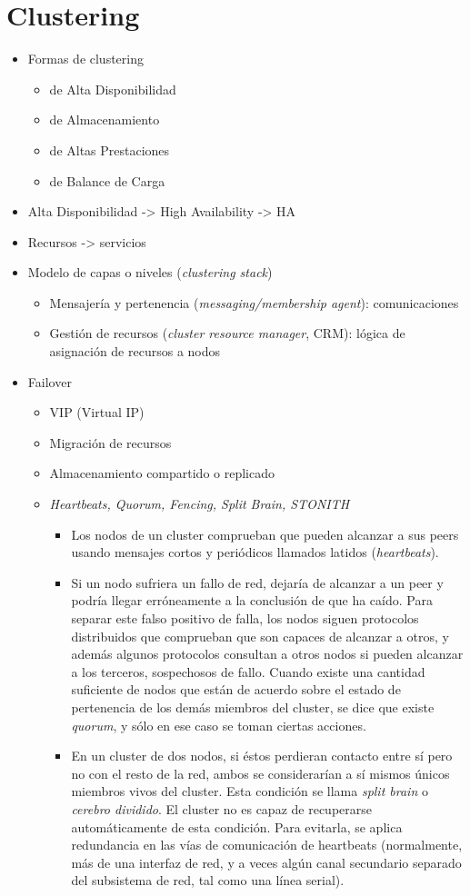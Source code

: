 
\section {Clustering}
\begin{itemize}
	\item Formas de clustering
	\begin{itemize}
		\item de Alta Disponibilidad
		\item de Almacenamiento
		\item de Altas Prestaciones
		\item de Balance de Carga
	\end{itemize}
	\item Alta Disponibilidad -> High Availability -> HA 
	\item Recursos ->  servicios
	\item Modelo de capas o niveles (\textit{clustering stack})
	\begin{itemize}
		\item Mensajería y pertenencia (\textit{messaging/membership agent}): comunicaciones
		\item Gestión de recursos (\textit{cluster resource manager}, CRM): lógica de asignación de recursos a nodos 
	\end{itemize}
	\item Failover
	\begin{itemize}
		\item VIP (Virtual IP)
		\item Migración de recursos
		\item Almacenamiento compartido o replicado
		\item \textit{Heartbeats, Quorum, Fencing, Split Brain, STONITH}
		\begin{itemize}
			\item Los nodos de un cluster comprueban que pueden alcanzar a sus peers usando mensajes cortos y periódicos llamados latidos (\textit{heartbeats}).
			\item Si un nodo sufriera un fallo de red, dejaría de alcanzar a un peer y podría llegar erróneamente a la conclusión de que ha caído. Para separar este falso positivo de falla, los nodos siguen protocolos distribuidos que comprueban que son capaces de alcanzar a otros, y además algunos protocolos consultan a otros nodos si pueden alcanzar a los terceros, sospechosos de fallo. Cuando existe una cantidad suficiente de nodos que están de acuerdo sobre el estado de pertenencia de los demás miembros del cluster, se dice que existe \textit{quorum}, y sólo en ese caso se toman ciertas acciones.
			\item En un cluster de dos nodos, si éstos perdieran contacto entre sí pero no con el resto de la red, ambos se considerarían a sí mismos únicos miembros vivos del cluster. Esta condición se llama \textit{split brain} o \textit{cerebro dividido}. El cluster no es capaz de recuperarse automáticamente de esta condición. Para evitarla, se aplica redundancia en las vías de comunicación de heartbeats (normalmente, más de una interfaz de red, y a veces algún canal secundario separado del subsistema de red, tal como una línea serial).


\end{itemize}
\end{itemize}
\end{itemize}
